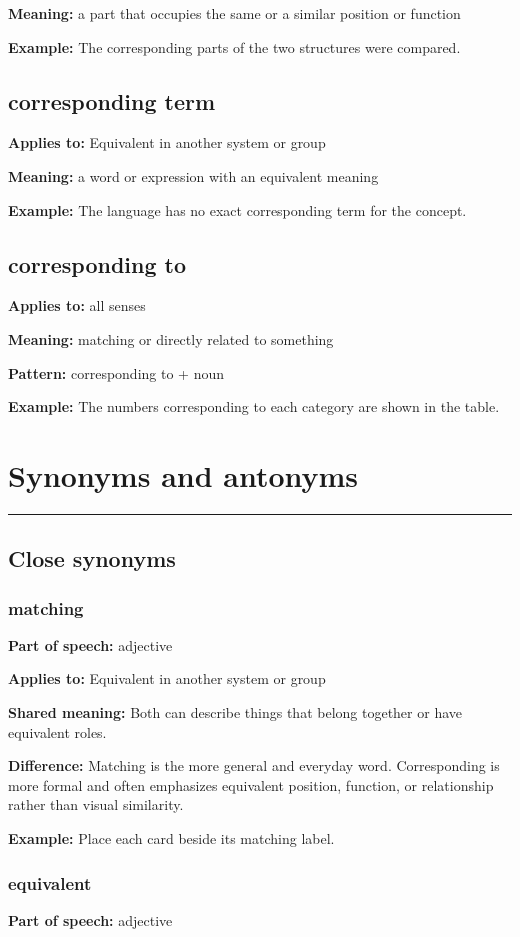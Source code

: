 \documentclass[11pt]{article}
\newcommand{\sectionrule}{\par\vspace{-0.5em}\noindent\textcolor{Accent}{\rule{\linewidth}{0.6pt}}\par}
\begin{document}
\textbf{Meaning:} a part that occupies the same or a similar position or function

\textbf{Example:} The corresponding parts of the two structures were compared.

\subsection{corresponding term}
\textbf{Applies to:} Equivalent in another system or group

\textbf{Meaning:} a word or expression with an equivalent meaning

\textbf{Example:} The language has no exact corresponding term for the concept.

\subsection{corresponding to}
\textbf{Applies to:} all senses

\textbf{Meaning:} matching or directly related to something

\textbf{Pattern:} corresponding to + noun

\textbf{Example:} The numbers corresponding to each category are shown in the table.

\section{Synonyms and antonyms}
\sectionrule
\subsection{Close synonyms}
\subsubsection{matching}
\textbf{Part of speech:} adjective

\textbf{Applies to:} Equivalent in another system or group

\textbf{Shared meaning:} Both can describe things that belong together or have equivalent roles.

\textbf{Difference:} Matching is the more general and everyday word. Corresponding is more formal and often emphasizes equivalent position, function, or relationship rather than visual similarity.

\textbf{Example:} Place each card beside its matching label.

\subsubsection{equivalent}
\textbf{Part of speech:} adjective
\end{document}
